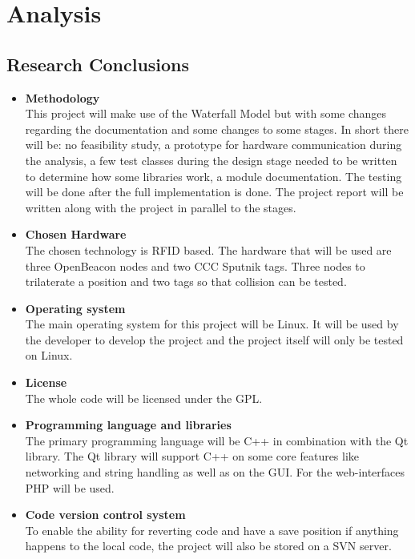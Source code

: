 \chapter{Analysis}
 \section{Research Conclusions}
 \label{sec:analysis:researchConclusions}
  \begin{itemize}
   \item \textbf{Methodology}\\
    This project will make use of the Waterfall Model but with some changes regarding the documentation and some changes to some stages. In short there will be: no feasibility study, a prototype for hardware communication during the analysis, a few test classes during the design stage needed to be written to determine how some libraries work, a module documentation. The testing will be done after the full implementation is done. The project report will be written along with the project in parallel to the stages.
   \item \textbf{Chosen Hardware}\\
    The chosen technology is RFID based. The hardware that will be used are three OpenBeacon nodes and two CCC Sputnik tags. Three nodes to trilaterate a position and two tags so that collision can be tested.
   \item \textbf{Operating system}\\
    The main operating system for this project will be Linux. It will be used by the developer to develop the project and the project itself will only be tested on Linux.
   \item \textbf{License}\\
    The whole code will be licensed under the GPL.
   \item \textbf{Programming language and libraries}\\
    The primary programming language will be C++ in combination with the Qt library. The Qt library will support C++ on some core features like networking and string handling as well as on the GUI. For the web-interfaces PHP will be used.
   \item \textbf{Code version control system}\\
    To enable the ability for reverting code and have a save position if anything happens to the local code, the project will also be stored on a SVN server.

\end{itemize}
